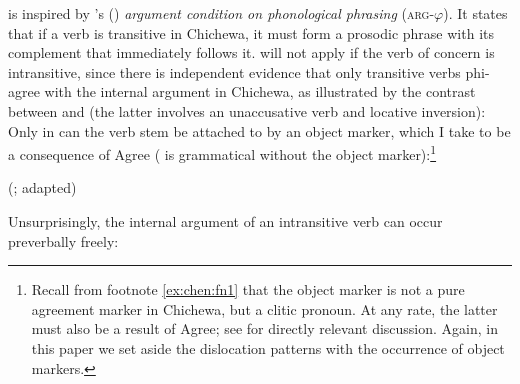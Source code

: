 \documentclass[output=paper,colorlinks,citecolor=brown
]{langscibook}
\begin{document}
  is inspired by \citeauthor{clemens2014prosodic}'s (\citeyear{clemens2014prosodic, clemens2016argument}) \textit{argument condition on phonological phrasing} (\textsc{arg}-$\varphi$). It states that if a verb is transitive in Chichewa, it must form a prosodic phrase with its complement that immediately follows it.  will not apply if the verb of concern is intransitive, since there is independent evidence that only transitive verbs phi-agree with the internal argument in Chichewa, as illustrated by the contrast between  and  (the latter involves an unaccusative verb and locative inversion): Only in  can the verb stem be attached to by an object marker, which I take to be a consequence of Agree ( is grammatical without the object marker):\footnote{Recall from footnote \ref{ex:chen:fn1} that the object marker is not a pure agreement marker in Chichewa, but a clitic pronoun. At any rate, the latter must also be a result of Agree; see \citealp{baker2018OM} for directly relevant discussion. Again, in this paper we set aside the dislocation patterns with the occurrence of object markers.}

\label{ex:chen:omgood}
\z


  \hfill (\citealp{mchombo2004syntax}; adapted)\label{ex:chen:ombad}
\z

 Unsurprisingly, the internal argument of an intransitive verb can occur preverbally freely:

\z

\z
\end{document}
